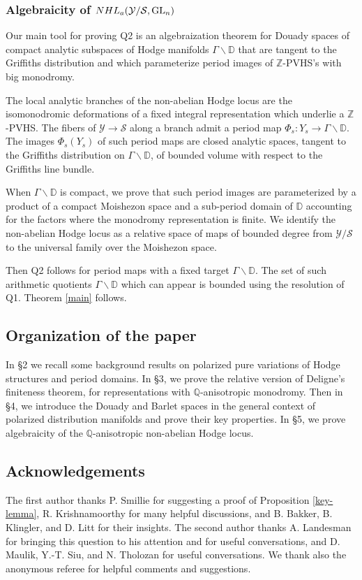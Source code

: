 \documentclass[10pt,letterpaper,english,reqno]{amsart}
\numberwithin{equation}{subsection}
\newcommand\cS{{\mathcal S}}
\newcommand\cY{{\mathcal Y}}
\newcommand\bD{{\mathbb D}}
\newcommand\Q{{\mathbb Q}}
\newcommand\Z{{\mathbb Z}}
\DeclareMathOperator{\GL}{GL}
\theoremstyle{definition}
\begin{document}
\subsubsection{Algebraicity of ${\rm NHL}_a(\cY/\cS,\GL_n)$}

Our main tool for proving Q2 is an algebraization theorem
for Douady spaces of compact analytic subspaces
of Hodge manifolds $\Gamma\backslash \bD$ that are tangent to the Griffiths distribution and which
parameterize period images of $\Z$-PVHS's
with big monodromy.

The local analytic branches of the non-abelian Hodge
locus are the isomonodromic deformations of a fixed integral
representation which underlie a $\Z$-PVHS.
The fibers of $\cY\rightarrow \cS$ along a branch
admit a period map $\Phi_s\colon Y_s\to \Gamma\backslash \bD$.
The images $\Phi_s(Y_s)$ of such period maps are 
closed analytic spaces,
tangent to the Griffiths distribution on $\Gamma\backslash \bD$,
of bounded volume with respect to the Griffiths line bundle.

When $\Gamma\backslash \bD$ is compact, we prove that such period
images are parameterized by a product of a compact Moishezon space
and a sub-period domain of $\bD$ accounting for the factors where the
monodromy representation is finite. We identify the non-abelian Hodge
locus as a relative space of maps of bounded degree from $\cY/\cS$ to the universal family over the Moishezon space.

Then Q2 follows for period maps with a fixed target $\Gamma\backslash \bD$.
The set of such arithmetic quotients $\Gamma\backslash \bD$ which
can appear is bounded using the resolution of Q1. Theorem \ref{main} follows.

\subsection{Organization of the paper}
In \S 2 we recall some background results on polarized pure variations of Hodge structures and period domains. 
In \S 3, we prove
the relative version of Deligne's finiteness theorem, for
representations with $\Q$-anisotropic monodromy.
Then in \S 4, we introduce
the Douady and Barlet spaces in the general context of polarized
distribution manifolds and prove their key properties. In \S 5,
we prove algebraicity of the $\Q$-anisotropic non-abelian Hodge locus. 

\subsection{Acknowledgements}
The first author thanks P. Smillie for suggesting a
proof of Proposition \ref{key-lemma}, R. Krishnamoorthy for many helpful discussions, and B. Bakker, B. Klingler, and D. Litt for their
insights.
The second author thanks A. Landesman for bringing this question
to his attention and for useful conversations, and D. Maulik, Y.-T. Siu, and N. Tholozan for useful conversations. We thank also the anonymous referee for helpful comments and suggestions.
\end{document}
